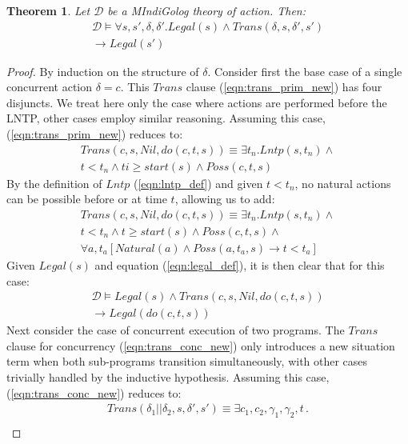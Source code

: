 \documentclass[letterpaper]{article}
\newtheorem{theorem}{Theorem}
\begin{document}
\begin{theorem}
\label{thm:trans_legal}
Let $\mathcal{D}$ be a MIndiGolog theory of action. Then:
\begin{multline*}
\mathcal{D} \models \forall s,s',\delta,\delta'.Legal(s)\wedge Trans(\delta,s,\delta',s')\\
\rightarrow Legal(s')
\end{multline*}
\end{theorem}

\begin{proof}
By induction on the structure of $\delta$.
Consider first the base case of a single concurrent action $\delta=c$.  This
$Trans$ clause (\ref{eqn:trans_prim_new}) has four disjuncts. We treat
here only the
case where actions are performed before the LNTP, other
cases employ similar reasoning.
Assuming this case, (\ref{eqn:trans_prim_new}) reduces to:
\begin{multline*}
Trans(c,s,Nil,do(c,t,s)) \equiv \exists t_n . Lntp(s,t_n) \wedge \\
  t < t_n \wedge ti \geq start(s) \wedge Poss(c,t,s)
\end{multline*}
By the definition of $Lntp$ (\ref{eqn:lntp_def}) and given $t < t_n$,
no natural actions
can be possible before or at time $t$, allowing us to add:
\begin{multline*}
Trans(c,s,Nil,do(c,t,s)) \equiv \exists t_n . Lntp(s,t_n) \wedge \\
  t < t_n \wedge t \geq start(s) \wedge Poss(c,t,s) \wedge\\
  \forall a,t_a \left[ Natural(a) \wedge Poss(a,t_a,s) \rightarrow t < t_a \right]
\end{multline*}
Given $Legal(s)$ and equation (\ref{eqn:legal_def}), it is then clear that for
this case:
\begin{multline*}
\mathcal{D} \models Legal(s) \wedge Trans(c,s,Nil,do(c,t,s))\\
\rightarrow Legal(do(c,t,s))
\end{multline*}
Next consider the case of concurrent execution of two programs.  The $Trans$
clause  for concurrency (\ref{eqn:trans_conc_new}) only introduces a
new situation term when both
sub-programs transition simultaneously, with other cases trivially handled by
the inductive hypothesis.  Assuming this case, (\ref{eqn:trans_conc_new})
reduces to:
\begin{multline*}
Trans(\delta_{1}||\delta_{2},s,\delta',s')\equiv \exists c_{1},c_{2},\gamma_{1},\gamma_{2},t\,.\\

\end{multline*}
\end{proof}
\end{document}
